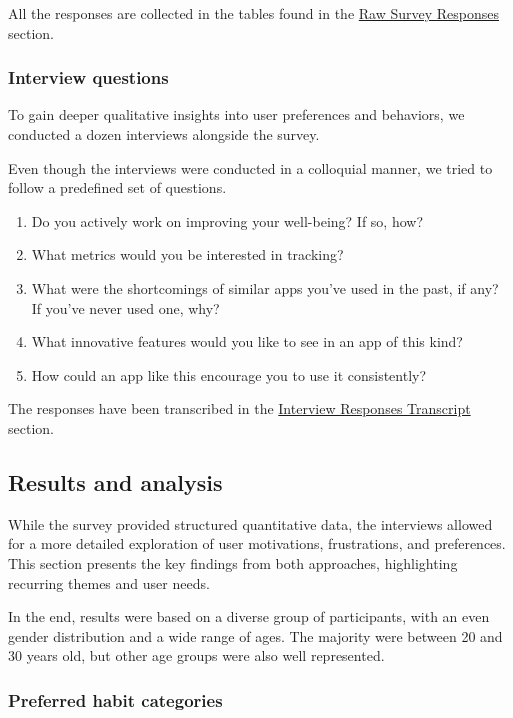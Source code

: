 \documentclass{article}
\begin{document}
All the responses are collected in the tables found in the \hyperref[subsec:survey-responses]{Raw Survey Responses} section.

\subsubsection{Interview questions}

To gain deeper qualitative insights into user preferences and behaviors, we conducted a dozen interviews alongside the survey.

Even though the interviews were conducted in a colloquial manner, we tried to follow a predefined set of questions.

\begin{enumerate}
    \item Do you actively work on improving your well-being? If so, how?
    \item What metrics would you be interested in tracking?
    \item What were the shortcomings of similar apps you’ve used in the past, if any? If you’ve never used one, why?
    \item What innovative features would you like to see in an app of this kind?
    \item How could an app like this encourage you to use it consistently?
\end{enumerate}

The responses have been transcribed in the \hyperref[subsec:interview-responses]{Interview Responses Transcript} section.

\subsection{Results and analysis}

While the survey provided structured quantitative data, the interviews allowed for a more detailed exploration of user motivations, frustrations, and preferences.
This section presents the key findings from both approaches, highlighting recurring themes and user needs.

In the end, results were based on a diverse group of participants, with an even gender distribution and a wide range of ages.
The majority were between 20 and 30 years old, but other age groups were also well represented.

\subsubsection{Preferred habit categories}
\end{document}
